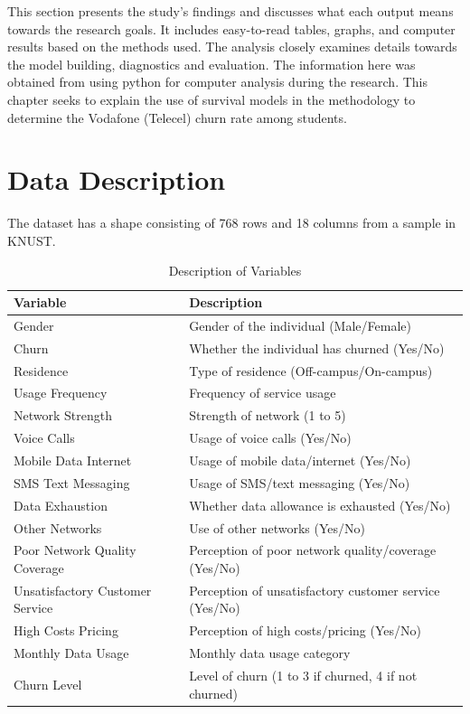 \documentclass[doublespacing]{report} %
\begin{document}
This section presents the study's findings and discusses what each output means towards the research goals. It includes easy-to-read tables, graphs, and computer results based on the methods used. The analysis closely examines details towards the model building, diagnostics and evaluation. The information here was obtained from using python for computer analysis during the research. This chapter seeks to explain the use of survival models in the methodology to determine the Vodafone (Telecel) churn rate among students.

\section{Data Description}

The dataset has a shape consisting of 768 rows and 18 columns from a sample in KNUST.

\begin{table}[H]
    \centering
    \begin{tabular}{ll}
        \toprule
        Variable & Description \\
        \midrule
        Gender & Gender of the individual (Male/Female) \\
        Churn & Whether the individual has churned (Yes/No) \\
        Residence & Type of residence (Off-campus/On-campus) \\
        Usage Frequency & Frequency of service usage  \\
        Network Strength & Strength of network (1 to 5) \\
        Voice Calls & Usage of voice calls (Yes/No) \\
        Mobile Data Internet & Usage of mobile data/internet (Yes/No) \\
        SMS Text Messaging & Usage of SMS/text messaging (Yes/No) \\
        Data Exhaustion & Whether data allowance is exhausted (Yes/No) \\
        Other Networks & Use of other networks (Yes/No) \\
        Poor Network Quality Coverage & Perception of poor network quality/coverage (Yes/No) \\
        Unsatisfactory Customer Service & Perception of unsatisfactory customer service (Yes/No) \\
        High Costs Pricing & Perception of high costs/pricing (Yes/No) \\
        Monthly Data Usage & Monthly data usage category  \\
        Churn Level & Level of churn (1 to 3 if churned, 4 if not churned) \\
        \bottomrule
    \end{tabular}
    \caption{Description of Variables}
\end{table}
\end{document}
